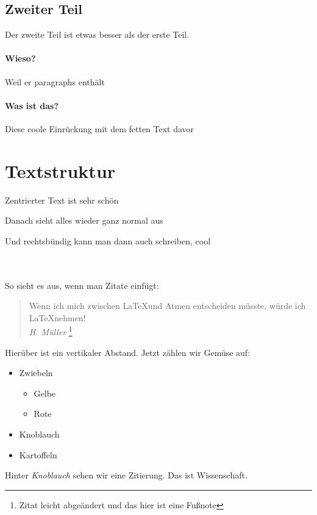 \documentclass{article}
\begin{document}
\subsection{Zweiter Teil}
Der zweite Teil ist etwas besser als der erste Teil.
\paragraph{Wieso?}
Weil er paragraphs enthält
\paragraph{Was ist das?}
Diese coole Einrückung mit dem fetten Text davor

\newpage

\section{Textstruktur}
\begin{center}
Zentrierter Text ist sehr schön
\end{center}
Danach sieht alles wieder ganz normal aus 
\begin{flushright}
Und rechtsbündig kann man dann auch schreiben, cool
\end{flushright}
\\\\
So sieht es aus, wenn man Zitate einfügt:\\
\begin{quote}
    Wenn ich mich zwischen \LaTeX und Atmen entscheiden müsste, würde ich \LaTeX nehmen! \\ \textit{H. Müller} \footnote{Zitat leicht abgeändert und das hier ist eine Fußnote}
\end{quote}
\vspace{2cm}
Hierüber ist ein vertikaler Abstand. Jetzt zählen wir Gemüse auf:
\begin{itemize}
    \item Zwiebeln
    \begin{itemize}
        \item Gelbe
        \item Rote
    \end{itemize}
    \item Knoblauch \cite{mustermann.1996}
    \item Kartoffeln\\
\end{itemize}
Hinter \textit{Knoblauch} sehen wir eine Zitierung. Das ist Wissenschaft.
\end{document}
